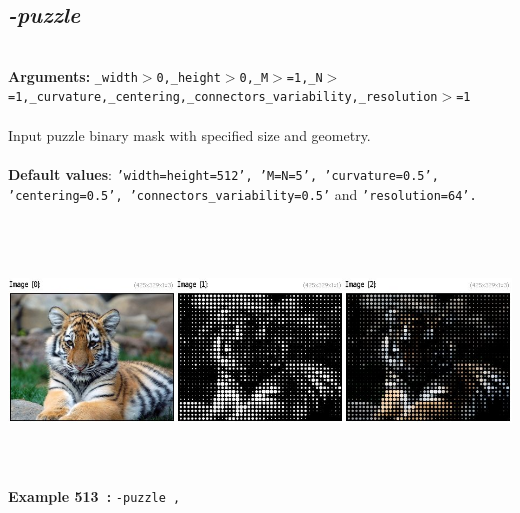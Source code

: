 \documentclass[a4paper,11pt,twoside]{book}
\begin{document}
\subsection{\emph{-puzzle} }\vspace*{-0.5em}
~\\\textbf{Arguments: } 
{\small \texttt{\_width$>$0,\_height$>$0,\_M$>$=1,\_N$>$=1,\_curvature,\_centering,\_connectors\_variability,\_resolution$>$=1}}\\~\\
Input puzzle binary mask with specified size and geometry.
~\\~\\\textbf{Default values}: {\small \texttt{'width=height=512', 'M=N=5', 'curvature=0.5', 'centering=0.5', 'connectors\_variability=0.5'} and \texttt{'resolution=64'.}}
\begin{center}\includegraphics[keepaspectratio=true,height=7cm,width=\textwidth]{img/gmic_def513.jpg}\\
{\footnotesize \textbf{Example 513~:} \texttt{-puzzle ,}}
\end{center}
\end{document}
